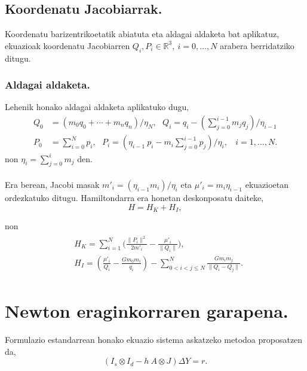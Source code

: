 \subsection*{Koordenatu Jacobiarrak.}

Koordenatu barizentrikoetatik abiatuta eta aldagai aldaketa bat aplikatuz, ekuazioak koordenatu Jacobiarren  $Q_i,P_i \in \mathbb{R}^3, \ i=0,\dots,N$ arabera berridatziko ditugu. 

\subsubsection*{Aldagai aldaketa.}
Lehenik honako aldagai aldaketa aplikatuko dugu,
\begin{align*}
Q_0 &=(m_0 q_0+\cdots+m_n q_n)/\eta_N,\ \ \ Q_i  =q_i-\left(\sum_{j=0}^{i-1}m_j q_j \right)/\eta_{i-1} \\
P_0 &=\sum\limits_{i=0}^{N}p_i, \ \ \ P_i =\left(\eta_{i-1} \ p_i- m_i \sum_{j=0}^{i-1} p_j\right)/\eta_i, \ \ \ \ i=1,\dots{,N}.
\end{align*}
non $\eta_i=\sum_{j=0}^{i} m_j$ den.

\paragraph*{}Era berean, Jacobi masak $m'_i=(\eta_{i-1} m_i)/\eta_i$ eta $\mu'_i=m_i \eta_{i-1}$ ekuazioetan ordezkatuko ditugu. Hamiltondarra era honetan deskonposatu daiteke,
\begin{equation*}
H=H_K+H_I,
\end{equation*} 

non
\begin{align*}
\begin{split}
&H_K=\sum\limits_{i=1}^{N}\bigg(\frac{\|P_i\|^2}{2 m'_i} -\frac{\mu'_i}{\|Q_i\|}\bigg), \\
&H_I=\left(\frac{\mu'_i}{Q_i}-\frac{Gm_0m_i}{q_i} \right) -\sum\limits_{0< i<j\le N}^{N} \frac{G m_i m_j}{\|Q_i-Q_j\|}.
\end{split}
\end{align*}

\section{Newton eraginkorraren garapena.}
\label{erans:B3}

Formulazio estandarrean honako ekuazio sistema askatzeko metodoa proposatzen da,
\begin{equation}
\label{eqA3:1}
(I_s \otimes I_d- h \ A \otimes J) \Delta Y =r.
\end{equation}

